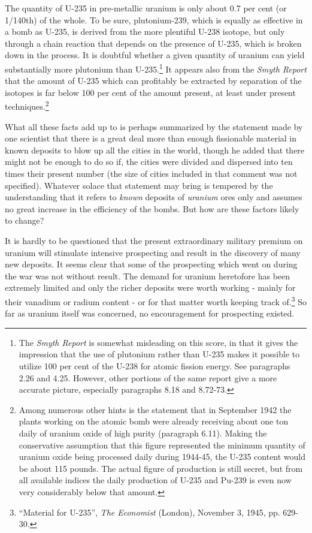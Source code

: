 The quantity of U-235 in pre-metallic uranium is only about 0.7 per cent (or 1/140th) of the whole. To be sure, plutonium-239, which is equally as effective in a bomb as U-235, is derived from the more plentiful U-238 isotope, but only through a chain reaction that depends on the presence of U-235, which is broken down in the process. It is doubtful whether a given quantity of uranium can yield substantially more plutonium than U-235.\footnote{The \emph{Smyth Report} is somewhat misleading on this score, in that it gives the impression that the use of plutonium rather than U-235 makes it possible to utilize 100 per cent of the U-238 for atomic fission energy. See paragraphs 2.26 and 4.25. However, other portions of the same report give a more accurate picture, especially paragraphs 8.18 and 8.72-73.} It appears also from the \emph{Smyth Report} that the amount of U-235 which can profitably be extracted by separation of the isotopes is far below 100 per cent of the amount present, at least under present techniques.\footnote{Among numerous other hints is the statement that in September 1942 the plants working on the atomic bomb were already receiving about one ton daily of uranium oxide of high purity (paragraph 6.11). Making the conservative assumption that this figure represented the minimum quantity of uranium oxide being processed daily during 1944-45, the U-235 content would be about 115 pounds. The actual figure of production is still secret, but from all available indices the daily production of U-235 and Pu-239 is even now very considerably below that amount.}

What all these facts add up to is perhaps summarized by the statement made by one scientist that there is a great deal more than enough fissionable material in known deposits to blow up all the cities in the world, though he added that there might not be enough to do so if, the cities were divided and dispersed into ten times their present number (the size of cities included in that comment was not specified). Whatever solace that statement may bring is tempered by the understanding that it refers to \emph{known} deposits of \emph{uranium} ores only and assumes no great increase in the efficiency of the bombs. But how are these factors likely to change?

It is hardly to be questioned that the present extraordinary military premium on uranium will stimulate intensive prospecting and result in the discovery of many new deposits. It seems clear that some of the prospecting which went on during the war was not without result. The demand for uranium heretofore has been extremely limited and only the richer deposits were worth working - mainly for their vanadium or radium content - or for that matter worth keeping track of.\footnote{``Material for U-235'', \textit{The Economist} (London), November 3, 1945, pp. 629-30.} So far as uranium itself was concerned, no encouragement for prospecting existed.

